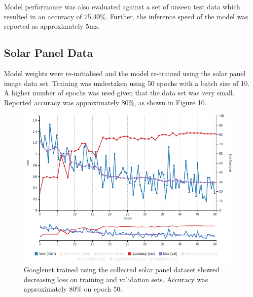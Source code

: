 \documentclass[10pt,journal,compsoc]{IEEEtran}
\begin{document}
		Model performance was also evaluated against a set of unseen test data which resulted in an accuracy of 75.40\%. Further, the inference speed of the model was reported as approximately 5$\si{\milli\second}$.
		
		\subsection{Solar Panel Data}
		Model weights were re-initialised and the model re-trained using the solar panel image data set. Training was undertaken using 50 epochs with a batch size of 10. A higher number of epochs was used given that the data set was very small. Reported accuracy was approximately 80\%, as shown in Figure 10. 
		\begin{figure}[h]
			\centering
			\includegraphics[scale=0.3]{googlenet_train_img}
			\caption{Googlenet trained using the collected solar panel dataset showed decreasing loss on training and validation sets. Accuracy was approximately 80\% on epoch 50.}
		\end{figure}
		
\end{document}
